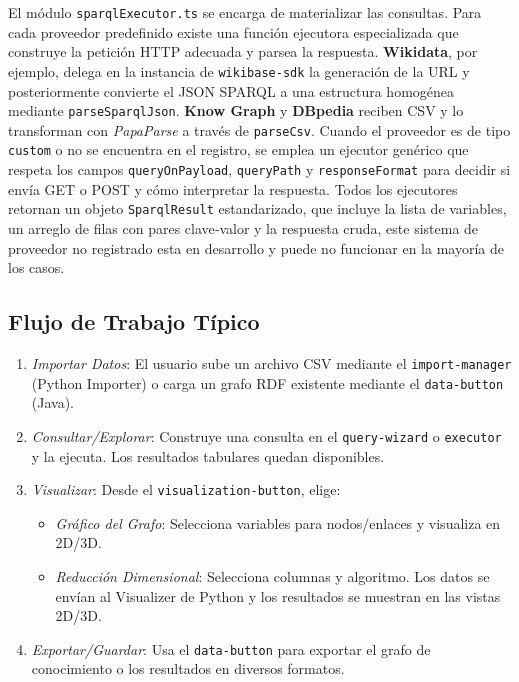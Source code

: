 \documentclass{article}
\begin{document}
El módulo \texttt{sparqlExecutor.ts} se encarga de materializar las consultas. Para cada proveedor predefinido existe una función ejecutora especializada que construye la petición HTTP adecuada y parsea la respuesta. \textbf{Wikidata}, por ejemplo, delega en la instancia de \texttt{wikibase-sdk} la generación de la URL y posteriormente convierte el JSON SPARQL a una estructura homogénea mediante \texttt{parseSparqlJson}. \textbf{Know Graph} y \textbf{DBpedia} reciben CSV y lo transforman con \textit{PapaParse} a través de \texttt{parseCsv}. Cuando el proveedor es de tipo \texttt{custom} o no se encuentra en el registro, se emplea un ejecutor genérico que respeta los campos \texttt{queryOnPayload}, \texttt{queryPath} y \texttt{responseFormat} para decidir si envía GET o POST y cómo interpretar la respuesta. Todos los ejecutores retornan un objeto \texttt{SparqlResult} estandarizado, que incluye la lista de variables, un arreglo de filas con pares clave‑valor y la respuesta cruda, este sistema de proveedor no registrado esta en desarrollo y puede no funcionar en la mayoría de los casos.


\subsection{Flujo de Trabajo Típico}
\begin{enumerate}
    \item \textit{Importar Datos}: El usuario sube un archivo CSV mediante el \texttt{import-manager} (Python Importer) o carga un grafo RDF existente mediante el \texttt{data-button} (Java).
    \item \textit{Consultar/Explorar}: Construye una consulta en el \texttt{query-wizard} o \texttt{executor} y la ejecuta. Los resultados tabulares quedan disponibles.
    \item \textit{Visualizar}: Desde el \texttt{visualization-button}, elige:
    \begin{itemize}
        \item \textit{Gráfico del Grafo}: Selecciona variables para nodos/enlaces y visualiza en 2D/3D.
        \item \textit{Reducción Dimensional}: Selecciona columnas y algoritmo. Los datos se envían al Visualizer de Python y los resultados se muestran en las vistas 2D/3D.
    \end{itemize}
    \item \textit{Exportar/Guardar}: Usa el \texttt{data-button} para exportar el grafo de conocimiento o los resultados en diversos formatos.
\end{enumerate}
\end{document}

